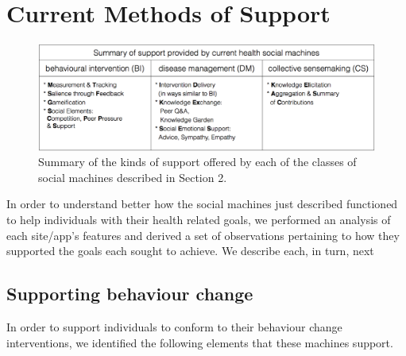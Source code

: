 \documentclass{sig-alternate}
\begin{document}
\section{Current Methods of Support}

\begin{figure}[htb]
\begin{center}
\includegraphics[width=16cm]{img/table2-summary.png}
\caption{Summary of the kinds of support offered by each of the classes of social machines described in Section 2.} \label{fig:summaryofsupport}
\end{center}
\end{figure}


In order to understand better how the social machines just described
functioned to help individuals with their health related goals, we
performed an analysis of each site/app's features and derived a set of
observations pertaining to how they supported the goals each sought to
achieve.  We describe each, in turn, next

\subsection{Supporting behaviour change}
\label{sec:intervention}

In order to support individuals to conform to their behaviour change
interventions, we identified the following elements that these machines
support.
\end{document}
